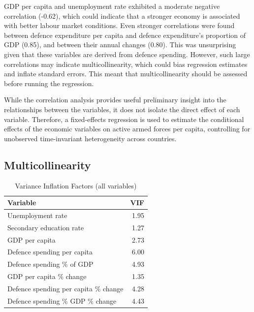 GDP per capita and unemployment rate exhibited a moderate negative correlation (-0.62), which could indicate that a stronger economy is associated with better labour market conditions. 
Even stronger correlations were found between defence expenditure per capita and defence expenditure's proportion of GDP (0.85), and between their annual changes (0.80). 
This was unsurprising given that these variables are derived from defence spending. 
However, such large correlations may indicate multicollinearity, which could bias regression estimates and inflate standard errors. 
This meant that multicollinearity should be 
assessed before running the regression.

While the correlation analysis provides useful preliminary insight into the relationships between the variables, it does not isolate the direct effect of each variable. 
Therefore, a fixed-effects regression is used to estimate the conditional effects of the economic variables on active armed forces per capita, controlling for unobserved time-invariant heterogeneity across countries.

\subsection{Multicollinearity}

\begin{table}[ht]
\caption{Variance Inflation Factors (all variables)}
\small
\centering
\begin{tabularx}{\textwidth}{l r}
\toprule
\textbf{Variable} & \textbf{VIF} \\
\midrule
Unemployment rate & 1.95 \\
Secondary education rate & 1.27 \\
GDP per capita & 2.73 \\
Defence spending per capita & 6.00 \\
Defence spending \% of GDP & 4.93 \\
GDP per capita \% change & 1.35 \\
Defence spending per capita \% change & 4.28 \\
Defence spending \% GDP \% change & 4.43 \\
\bottomrule
\end{tabularx}
\label{tab:multicollinearity_full}
\end{table}

